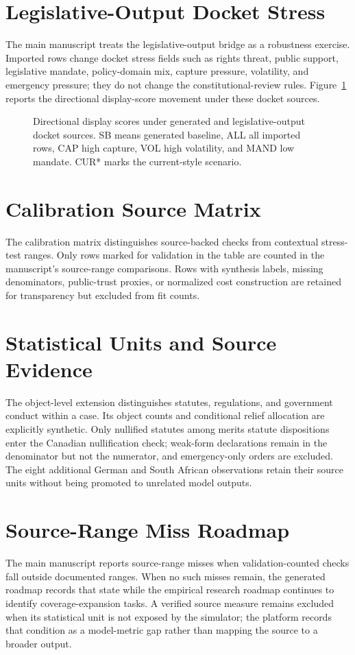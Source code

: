 \documentclass[
  journal=small,
  manuscript=research-article,
  year=2026
]{cup-journal}
\begin{document}
\section*{Legislative-Output Docket Stress}
The main manuscript treats the legislative-output bridge as a robustness exercise. Imported rows change docket stress fields such as rights threat, public support, legislative mandate, policy-domain mix, capture pressure, volatility, and emergency pressure; they do not change the constitutional-review rules. Figure~\ref{fig:paired-import} reports the directional display-score movement under these docket sources.

\begin{figure}[hbt!]
\centering

\caption{Directional display scores under generated and legislative-output docket sources. SB means generated baseline, ALL all imported rows, CAP high capture, VOL high volatility, and MAND low mandate. CUR* marks the current-style scenario.}
\label{fig:paired-import}
\end{figure}

\section*{Calibration Source Matrix}
The calibration matrix distinguishes source-backed checks from contextual stress-test ranges. Only rows marked for validation in the table are counted in the manuscript's source-range comparisons. Rows with synthesis labels, missing denominators, public-trust proxies, or normalized cost construction are retained for transparency but excluded from fit counts.


\section*{Statistical Units and Source Evidence}
The object-level extension distinguishes statutes, regulations, and government conduct within a case. Its object counts and conditional relief allocation are explicitly synthetic. Only nullified statutes among merits statute dispositions enter the Canadian nullification check; weak-form declarations remain in the denominator but not the numerator, and emergency-only orders are excluded. The eight additional German and South African observations retain their source units without being promoted to unrelated model outputs.


\section*{Source-Range Miss Roadmap}
The main manuscript reports source-range misses when validation-counted checks fall outside documented ranges. When no such misses remain, the generated roadmap records that state while the empirical research roadmap continues to identify coverage-expansion tasks. A verified source measure remains excluded when its statistical unit is not exposed by the simulator; the platform records that condition as a model-metric gap rather than mapping the source to a broader output.

\end{document}
